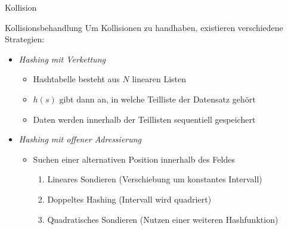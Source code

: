 \begin{defi}{Kollision}
\begin{center}
    \end{center}

\end{defi}

\begin{defi}{Kollisionsbehandlung}
    Um Kollisionen zu handhaben, existieren verschiedene Strategien:
    \begin{itemize}
        \item \emph{Hashing mit Verkettung}
              \begin{itemize}
                  \item Hashtabelle besteht aus $N$ linearen Listen
                  \item $h(s)$ gibt dann an, in welche Teilliste der Datensatz gehört
                  \item Daten werden innerhalb der Teillisten sequentiell gespeichert
              \end{itemize}
        \item \emph{Hashing mit offener Adressierung}
              \begin{itemize}
                  \item Suchen einer alternativen Position innerhalb des Feldes
                        \begin{enumerate}
                            \item Lineares Sondieren (Verschiebung um konstantes Intervall)
                            \item Doppeltes Hashing (Intervall wird quadriert)
                            \item Quadratisches Sondieren (Nutzen einer weiteren Hashfunktion)
                        \end{enumerate}
              \end{itemize}
    \end{itemize}
\end{defi}


